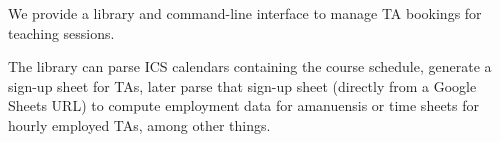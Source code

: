 We provide a library and command-line interface to manage TA bookings for 
teaching sessions.

The library can parse ICS calendars containing the course schedule, generate a 
sign-up sheet for TAs, later parse that sign-up sheet (directly from a Google 
Sheets URL) to compute employment data for amanuensis or time sheets for hourly 
employed TAs, among other things.

